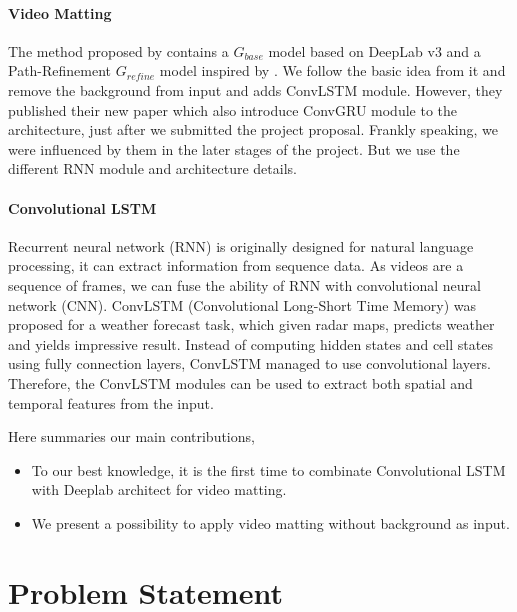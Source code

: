 \documentclass[final]{cvpr}
\begin{document}
\paragraph{Video Matting}

The method proposed by \cite{linRealTimeHighResolutionBackground2020a} contains a $G_{base}$ model based on DeepLab v3 and a Path-Refinement $G_{refine}$ model inspired by \cite{kirillovPointRendImageSegmentation2020}.
We follow the basic idea from it and remove the background from input and adds ConvLSTM module.
However, they published their new paper \cite{linRobustHighResolutionVideo2021} which also introduce ConvGRU module to the architecture, just after we submitted the project proposal.
Frankly speaking, we were influenced by them in the later stages of the project.
But we use the different RNN module and architecture details.

\paragraph{Convolutional LSTM}

Recurrent neural network (RNN) is originally designed for natural language processing, it can extract information from sequence data.
As videos are a sequence of frames, we can fuse the ability of RNN with convolutional neural network (CNN).
ConvLSTM (Convolutional Long-Short Time Memory) \cite{shiConvolutionalLSTMNetwork2015} was proposed for a weather forecast task, which given radar maps, predicts weather and yields impressive result.
Instead of computing hidden states and cell states using fully connection layers, ConvLSTM managed to use convolutional layers.
Therefore, the ConvLSTM modules can be used to extract both spatial and temporal features from the input.

Here summaries our main contributions,

\begin{itemize}
    \item To our best knowledge, it is the first time to combinate Convolutional LSTM with Deeplab architect for video matting.
    \item We present a possibility to apply video matting without background as input.
\end{itemize}

\section{Problem Statement}
\end{document}
